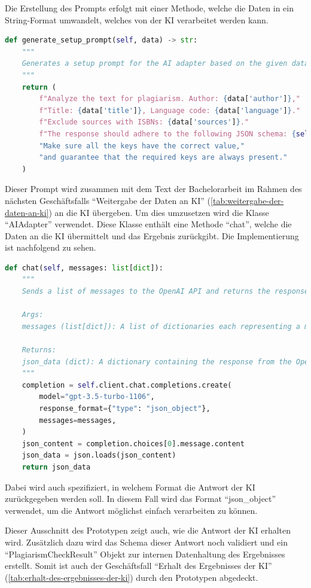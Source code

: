 Die Erstellung des Prompts erfolgt mit einer Methode, welche die Daten in ein String-Format umwandelt,
welches von der KI verarbeitet werden kann.
\begin{lstlisting}[caption={Erstellung eines Prompts für die KI},captionpos=b,label={lst:prompt-erstellen}, language=Python, breaklines=true]
def generate_setup_prompt(self, data) -> str:
    """
    Generates a setup prompt for the AI adapter based on the given data.
    """
    return (
        f"Analyze the text for plagiarism. Author: {data['author']},"
        f"Title: {data['title']}, Language code: {data['language']}."
        f"Exclude sources with ISBNs: {data['sources']}."
        f"The response should adhere to the following JSON schema: {self.schema}"
        "Make sure all the keys have the correct value,"
        "and guarantee that the required keys are always present."
    )
\end{lstlisting}

Dieser Prompt wird zusammen mit dem Text der Bachelorarbeit im Rahmen des nächsten Geschäftsfalls
``Weitergabe der Daten an KI'' (\ref{tab:weitergabe-der-daten-an-ki}) an die KI übergeben.
Um dies umzusetzen wird die Klasse ``AIAdapter'' verwendet.
Diese Klasse enthält eine Methode ``chat'', welche die Daten an die KI übermittelt und das Ergebnis zurückgibt.
Die Implementierung ist nachfolgend zu sehen.
\begin{lstlisting}[caption={Weitergabe der Daten an KI},captionpos=b,label={lst:weitergabe-an-ki}, language=Python, breaklines=true]
def chat(self, messages: list[dict]):
    """
    Sends a list of messages to the OpenAI API and returns the response.

    Args:
    messages (list[dict]): A list of dictionaries each representing a message.

    Returns:
    json_data (dict): A dictionary containing the response from the OpenAI API.
    """
    completion = self.client.chat.completions.create(
        model="gpt-3.5-turbo-1106",
        response_format={"type": "json_object"},
        messages=messages,
    )
    json_content = completion.choices[0].message.content
    json_data = json.loads(json_content)
    return json_data
\end{lstlisting}

Dabei wird auch spezifiziert, in welchem Format die Antwort der KI zurückgegeben werden soll.
In diesem Fall wird das Format ``json\_object'' verwendet, um die Antwort möglichst einfach verarbeiten zu können.

Dieser Ausschnitt des Prototypen zeigt auch, wie die Antwort der KI erhalten wird.
Zusätzlich dazu wird das Schema dieser Antwort noch validiert und ein ``PlagiarismCheckResult''
Objekt zur internen Datenhaltung des Ergebnisses erstellt.
Somit ist auch der Geschäftsfall ``Erhalt des Ergebnisses der KI'' (\ref{tab:erhalt-des-ergebnisses-der-ki}) durch den Prototypen abgedeckt.

